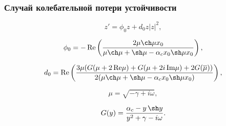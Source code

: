 \documentclass[fullscreen=true, unicode, bookmarks=false]{beamer}
\begin{document}
\begin{frame}
\frametitle{ Случай колебательной потери устойчивости }

\begin{equation}
	z' = \phi_0 z + d_0 z |z|^2,
\end{equation}

\bigskip

$$ \phi_0 = -\operatorname{Re} \left(\frac{ 2 \mu \ch \mu x_0 }{ \mu \ch \mu +\sh \mu - \alpha_c x_0 \sh \mu x_0 }\right), $$

$$ d_0 = \operatorname{Re} \left(\frac{ 3 \mu ( G(\mu + 2\,\mbox{Re}\mu) + G(\mu + 2i\,\mbox{Im}\mu) + 2G(\overline{\mu}) ) }{ 2 ( \mu \ch \mu +\sh \mu - \alpha_c x_0 \sh \mu x_0 ) }\right), $$

\bigskip

$$ \mu = \sqrt{-\gamma + i \omega}, $$

$$ G(y) = \frac{ \alpha_c - y\,\sh y }{ y^2 + \gamma - i\omega }. $$

\end{frame}
\end{document}
